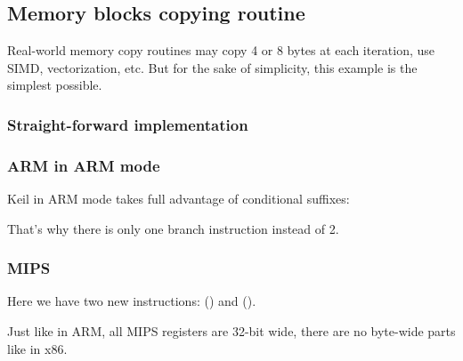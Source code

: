 ﻿\subsection{Memory blocks copying routine}
\label{loop_memcpy}

Real-world memory copy routines may copy 4 or 8 bytes at each iteration, use \ac{SIMD}, 
vectorization, etc.
But for the sake of simplicity, this example is the simplest possible.



\subsubsection{Straight-forward implementation}







\subsubsection{ARM in ARM mode}

Keil in ARM mode takes full advantage of conditional suffixes:



That's why there is only one branch instruction instead of 2.

\subsubsection{MIPS}




Here we have two new instructions:  () and  ().

Just like in ARM, all MIPS registers are 32-bit wide, there are no byte-wide parts like in x86.

